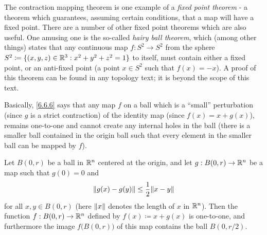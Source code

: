 \begin{rmk}\label{6.6.5}
  The contraction mapping theorem is one example of a \emph{fixed point theorem}
  - a theorem which guarantees, assuming certain conditions, that a map will have a fixed point.
  There are a number of other fixed point theorems which are also useful.
  One amusing one is the so-called \emph{hairy ball theorem}, which (among other things) states that any continuous map \(f : S^2 \to S^2\) from the sphere \(S^2 \coloneqq \{(x, y, z) \in \R^3 : x^2 + y^2 + z^2 = 1\}\) to itself, must contain either a fixed point, or an anti-fixed point
  (a point \(x \in S^2\) such that \(f(x) = -x\)).
  A proof of this theorem can be found in any topology text;
  it is beyond the scope of this text.
\end{rmk}

\begin{note}
  Basically, \cref{6.6.6} says that any map \(f\) on a ball which is a ``small'' perturbation (since \(g\) is a strict contraction) of the identity map (since \(f(x) = x + g(x)\)), remains one-to-one and cannot create any internal holes in the ball
  (there is a smaller ball contained in the origin ball such that every element in the smaller ball can be mapped by \(f\)).
\end{note}

\begin{lem}\label{6.6.6}
  Let \(B(0, r)\) be a ball in \(\R^n\) centered at the origin, and let \(g : B(0, r) \to \R^n\) be a map such that \(g(0) = 0\) and
  \[
    \norm*{g(x) - g(y)} \leq \dfrac{1}{2} \norm*{x - y}
  \]
  for all \(x, y \in B(0, r)\)
  (here \(\norm*{x}\) denotes the length of \(x\) in \(\R^n\)).
  Then the function \(f : B(0, r) \to \R^n\) defined by \(f(x) \coloneqq x + g(x)\) is one-to-one, and furthermore the image \(f\big(B(0, r)\big)\) of this map contains the ball \(B(0, r / 2)\).
\end{lem}


